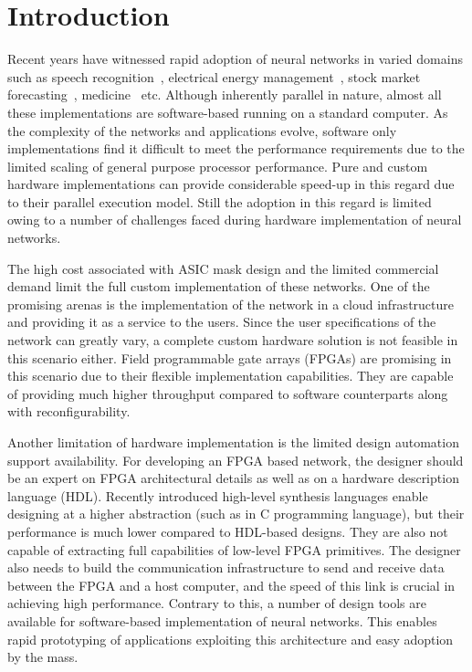 \section{Introduction}
\label{sec_intro}

Recent years have witnessed rapid adoption of neural networks in varied domains such as speech recognition~\cite{Deng2013}, electrical energy management~\cite{Houria2015}, stock market forecasting~\cite{Ticknor2015}, medicine~\cite{Azar2013} etc. 
Although inherently parallel in nature, almost all these implementations are software-based running on a standard computer.
As the complexity of the networks and applications evolve, software only implementations find it difficult to meet the performance requirements due to the limited scaling of general purpose processor performance.
Pure and custom hardware implementations can provide considerable speed-up in this regard due to their parallel execution model. 
Still the adoption in this regard is limited owing to a number of challenges faced during hardware implementation of neural networks.

The high cost associated with ASIC mask design and the limited commercial demand limit the full custom implementation of these networks.
One of the promising arenas is the implementation of the network in a cloud infrastructure~\cite{Yuan2014} and providing it as a service to the users.
Since the user specifications of the network can greatly vary, a complete custom hardware solution is not feasible in this scenario either.
Field programmable gate arrays (FPGAs) are promising in this scenario due to their flexible implementation capabilities.
They are capable of providing much higher throughput compared to software counterparts along with reconfigurability.

Another limitation of hardware implementation is the limited design automation support availability.
For developing an FPGA based network, the designer should be an expert on FPGA architectural details as well as on a hardware description language (HDL).
Recently introduced high-level synthesis languages enable designing at a higher abstraction (such as in C programming language), but their performance is much lower compared to HDL-based designs.
They are also not capable of extracting full capabilities of low-level FPGA primitives.
The designer also needs to build the communication infrastructure to send and receive data between the FPGA and a host computer, and the speed of this link is crucial in achieving high performance.
Contrary to this, a number of design tools are available for software-based implementation of neural networks.
This enables rapid prototyping of applications exploiting this architecture and easy adoption by the mass.

